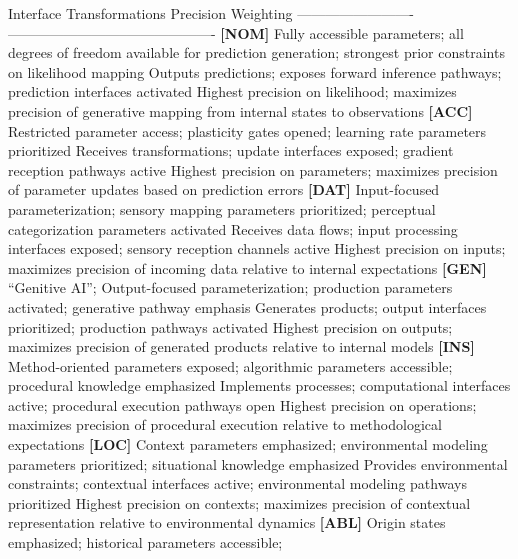 \documentclass[
  11pt,
  letterpaper,
]{article}
\begin{document}
\textbar{} Interface Transformations \textbar{} Precision Weighting
\textbar{}
\textbar------\textbar-------------------\textbar--------------------------\textbar-------------------\textbar{}
\textbar{} \textbf{{[}NOM{]}} \textbar{} Fully accessible parameters;
all degrees of freedom available for prediction generation; strongest
prior constraints on likelihood mapping \textbar{} Outputs predictions;
exposes forward inference pathways; prediction interfaces activated
\textbar{} Highest precision on likelihood; maximizes precision of
generative mapping from internal states to observations \textbar{}
\textbar{} \textbf{{[}ACC{]}} \textbar{} Restricted parameter access;
plasticity gates opened; learning rate parameters prioritized \textbar{}
Receives transformations; update interfaces exposed; gradient reception
pathways active \textbar{} Highest precision on parameters; maximizes
precision of parameter updates based on prediction errors \textbar{}
\textbar{} \textbf{{[}DAT{]}} \textbar{} Input-focused parameterization;
sensory mapping parameters prioritized; perceptual categorization
parameters activated \textbar{} Receives data flows; input processing
interfaces exposed; sensory reception channels active \textbar{} Highest
precision on inputs; maximizes precision of incoming data relative to
internal expectations \textbar{} \textbar{} \textbf{{[}GEN{]}}
\textbar{} ``Genitive AI''; Output-focused parameterization; production
parameters activated; generative pathway emphasis \textbar{} Generates
products; output interfaces prioritized; production pathways activated
\textbar{} Highest precision on outputs; maximizes precision of
generated products relative to internal models \textbar{} \textbar{}
\textbf{{[}INS{]}} \textbar{} Method-oriented parameters exposed;
algorithmic parameters accessible; procedural knowledge emphasized
\textbar{} Implements processes; computational interfaces active;
procedural execution pathways open \textbar{} Highest precision on
operations; maximizes precision of procedural execution relative to
methodological expectations \textbar{} \textbar{} \textbf{{[}LOC{]}}
\textbar{} Context parameters emphasized; environmental modeling
parameters prioritized; situational knowledge emphasized \textbar{}
Provides environmental constraints; contextual interfaces active;
environmental modeling pathways prioritized \textbar{} Highest precision
on contexts; maximizes precision of contextual representation relative
to environmental dynamics \textbar{} \textbar{} \textbf{{[}ABL{]}}
\textbar{} Origin states emphasized; historical parameters accessible;
\end{document}
